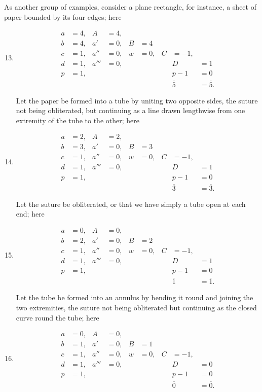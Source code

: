 \documentclass[11pt,a4paper]{book}
\begin{document}
\clearpage

As another group of examples, consider a plane rectangle, for instance, a sheet of
paper bounded by its four edges; here

\begin{enumerate}
\setcounter{enumi}{12}
\item
\begin{align*}
a &= 4, & A &= 4, \\
b &= 4, & a' &= 0, & B &= 4 \\
c &= 1, & a'' &= 0, & w &= 0, & C &= -1, \\
d &= 1, & a''' &= 0, & & & & D &= 1 \\
p &= 1, & & & & & & p - 1 &= 0 \\[2pt]
& & & & & & & \overline{5} &= \overline{5}.
\end{align*}

Let the paper be formed into a tube by uniting two opposite sides, the suture not
being obliterated, but continuing as a line drawn lengthwise from one extremity of
the tube to the other; here

\item
\begin{align*}
a &= 2, & A &= 2, \\
b &= 3, & a' &= 0, & B &= 3 \\
c &= 1, & a'' &= 0, & w &= 0, & C &= -1, \\
d &= 1, & a''' &= 0, & & & & D &= 1 \\
p &= 1, & & & & & & p - 1 &= 0 \\[2pt]
& & & & & & & \overline{3} &= \overline{3}.
\end{align*}

Let the suture be obliterated, or that we have simply a tube open at each end;
here

\item
\begin{align*}
a &= 0, & A &= 0, \\
b &= 2, & a' &= 0, & B &= 2 \\
c &= 1, & a'' &= 0, & w &= 0, & C &= -1, \\
d &= 1, & a''' &= 0, & & & & D &= 1 \\
p &= 1, & & & & & & p - 1 &= 0 \\[2pt]
& & & & & & & \overline{1} &= \overline{1}.
\end{align*}

Let the tube be formed into an annulus by bending it round and joining the
two extremities, the suture not being obliterated but continuing as the closed curve
round the tube; here

\item
\begin{align*}
a &= 0, & A &= 0, \\
b &= 1, & a' &= 0, & B &= 1 \\
c &= 1, & a'' &= 0, & w &= 0, & C &= -1, \\
d &= 1, & a''' &= 0, & & & & D &= 0 \\
p &= 1, & & & & & & p - 1 &= 0 \\[2pt]
& & & & & & & \overline{0} &= \overline{0}.
\end{align*}
\end{enumerate}
\end{document}
